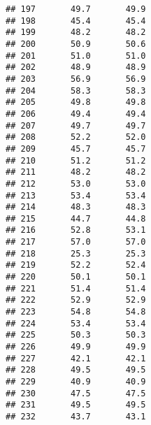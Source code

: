 \documentclass[]{article}
\newenvironment{Shaded}{\begin{snugshade}}{\end{snugshade}}
\newcommand{\DecValTok}[1]{\textcolor[rgb]{0.00,0.00,0.81}{#1}}
\newcommand{\KeywordTok}[1]{\textcolor[rgb]{0.13,0.29,0.53}{\textbf{#1}}}
\newcommand{\NormalTok}[1]{#1}
\newcommand{\OperatorTok}[1]{\textcolor[rgb]{0.81,0.36,0.00}{\textbf{#1}}}
\newcommand{\StringTok}[1]{\textcolor[rgb]{0.31,0.60,0.02}{#1}}
\begin{document}
\begin{verbatim}
## 197       49.7       49.9
## 198       45.4       45.4
## 199       48.2       48.2
## 200       50.9       50.6
## 201       51.0       51.0
## 202       48.9       48.9
## 203       56.9       56.9
## 204       58.3       58.3
## 205       49.8       49.8
## 206       49.4       49.4
## 207       49.7       49.7
## 208       52.2       52.0
## 209       45.7       45.7
## 210       51.2       51.2
## 211       48.2       48.2
## 212       53.0       53.0
## 213       53.4       53.4
## 214       48.3       48.3
## 215       44.7       44.8
## 216       52.8       53.1
## 217       57.0       57.0
## 218       25.3       25.3
## 219       52.2       52.4
## 220       50.1       50.1
## 221       51.4       51.4
## 222       52.9       52.9
## 223       54.8       54.8
## 224       53.4       53.4
## 225       50.3       50.3
## 226       49.9       49.9
## 227       42.1       42.1
## 228       49.5       49.5
## 229       40.9       40.9
## 230       47.5       47.5
## 231       49.5       49.5
## 232       43.7       43.1
\end{verbatim}

\begin{Shaded}
\end{Shaded}
\end{document}
